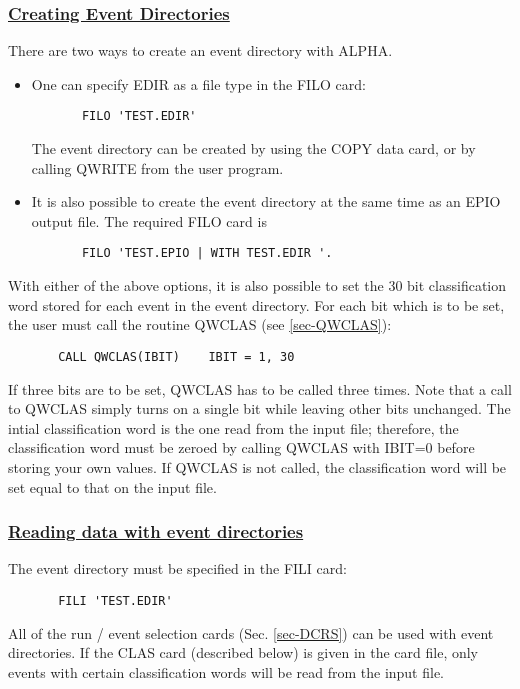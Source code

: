 \subsubsection{\underline{Creating Event Directories}}
There are two ways to create an event directory with ALPHA.
\begin{itemize}
\item One can specify EDIR as a file type in the FILO card:
\begin{verbatim}
       FILO 'TEST.EDIR'
\end{verbatim}
The event directory can be created by using the COPY data card, or
by
calling QWRITE from the user program.
\item It is also possible to create the event directory at the same
time as an EPIO output file. The required FILO card is
\begin{verbatim}
       FILO 'TEST.EPIO | WITH TEST.EDIR '.
\end{verbatim}
\end{itemize}
With either of the above options, it is also possible to set the
30 bit classification word stored for each event in the event directory.
For each bit which is to be set, the user must call the routine
QWCLAS (see \ref{sec-QWCLAS}):
\begin{verbatim}
       CALL QWCLAS(IBIT)    IBIT = 1, 30
\end{verbatim}
If three bits are to be set, QWCLAS has to be
called three times.
Note that a call to QWCLAS simply turns on a single
bit while leaving other bits unchanged.  The intial classification
word is the one read from the input file;  therefore,
the classification word must be zeroed by calling QWCLAS with
IBIT=0 before storing your own values.
If QWCLAS is not called, the classification
word will be set equal to that on the input file.
\par
\subsubsection{\underline{Reading data with event directories}}
The event directory must be
specified in the FILI card:
\begin{verbatim}
       FILI 'TEST.EDIR'
\end{verbatim}
All of the run / event selection cards (Sec. \ref{sec-DCRS})
can be used with event directories.
If the CLAS card (described below)
is given in the card file, only events with certain
classification words will be read from the input file.
\par
